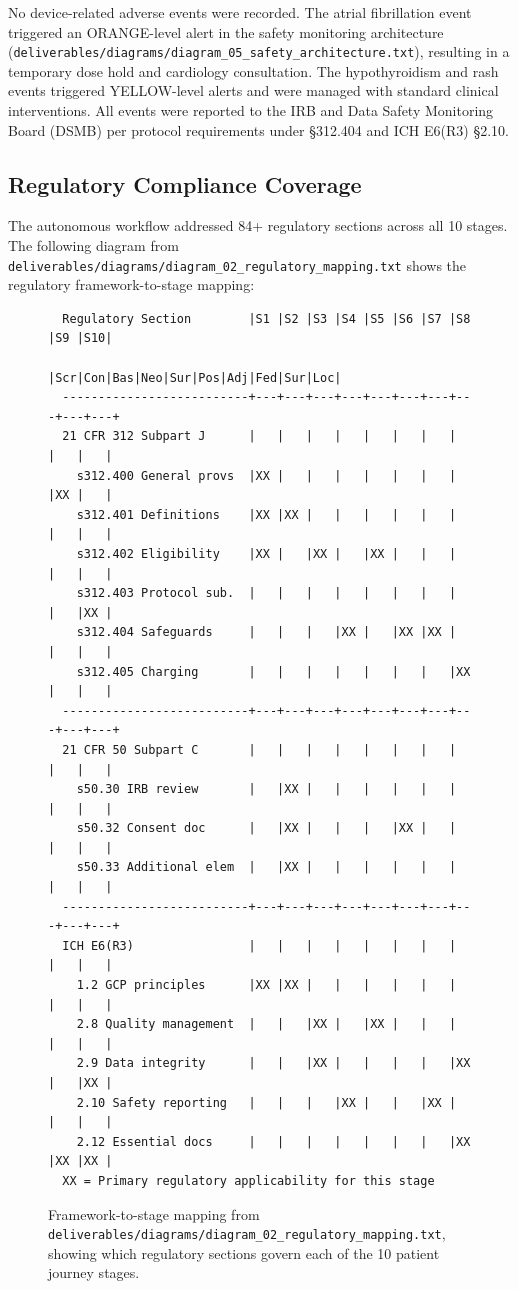 \documentclass{article}
\begin{document}
No device-related adverse events were recorded. The atrial fibrillation event triggered an ORANGE-level alert in the safety monitoring architecture (\texttt{deliverables/diagrams/diagram\_05\_safety\_architecture.txt}), resulting in a temporary dose hold and cardiology consultation. The hypothyroidism and rash events triggered YELLOW-level alerts and were managed with standard clinical interventions. All events were reported to the IRB and Data Safety Monitoring Board (DSMB) per protocol requirements under \S312.404 and ICH E6(R3) \S2.10.

\newpage

\subsection{Regulatory Compliance Coverage}

The autonomous workflow addressed 84+ regulatory sections across all 10 stages. The following diagram from \texttt{deliverables/diagrams/diagram\_02\_regulatory\_mapping.txt} shows the regulatory framework-to-stage mapping:



\begin{figure}[H]
\begin{verbatim}
  Regulatory Section        |S1 |S2 |S3 |S4 |S5 |S6 |S7 |S8 |S9 |S10|
                            |Scr|Con|Bas|Neo|Sur|Pos|Adj|Fed|Sur|Loc|
  --------------------------+---+---+---+---+---+---+---+---+---+---+
  21 CFR 312 Subpart J      |   |   |   |   |   |   |   |   |   |   |
    s312.400 General provs  |XX |   |   |   |   |   |   |   |XX |   |
    s312.401 Definitions    |XX |XX |   |   |   |   |   |   |   |   |
    s312.402 Eligibility    |XX |   |XX |   |XX |   |   |   |   |   |
    s312.403 Protocol sub.  |   |   |   |   |   |   |   |   |   |XX |
    s312.404 Safeguards     |   |   |   |XX |   |XX |XX |   |   |   |
    s312.405 Charging       |   |   |   |   |   |   |   |XX |   |   |
  --------------------------+---+---+---+---+---+---+---+---+---+---+
  21 CFR 50 Subpart C       |   |   |   |   |   |   |   |   |   |   |
    s50.30 IRB review       |   |XX |   |   |   |   |   |   |   |   |
    s50.32 Consent doc      |   |XX |   |   |   |XX |   |   |   |   |
    s50.33 Additional elem  |   |XX |   |   |   |   |   |   |   |   |
  --------------------------+---+---+---+---+---+---+---+---+---+---+
  ICH E6(R3)                |   |   |   |   |   |   |   |   |   |   |
    1.2 GCP principles      |XX |XX |   |   |   |   |   |   |   |   |
    2.8 Quality management  |   |   |XX |   |XX |   |   |   |   |   |
    2.9 Data integrity      |   |   |XX |   |   |   |   |XX |   |XX |
    2.10 Safety reporting   |   |   |   |XX |   |   |XX |   |   |   |
    2.12 Essential docs     |   |   |   |   |   |   |   |XX |XX |XX |
  XX = Primary regulatory applicability for this stage
\end{verbatim}
\caption{Framework-to-stage mapping from \texttt{deliverables/diagrams/diagram\_02\_regulatory\_mapping.txt}, showing which regulatory sections govern each of the 10 patient journey stages.}
\label{fig:reg-mapping}
\end{figure}
\end{document}
